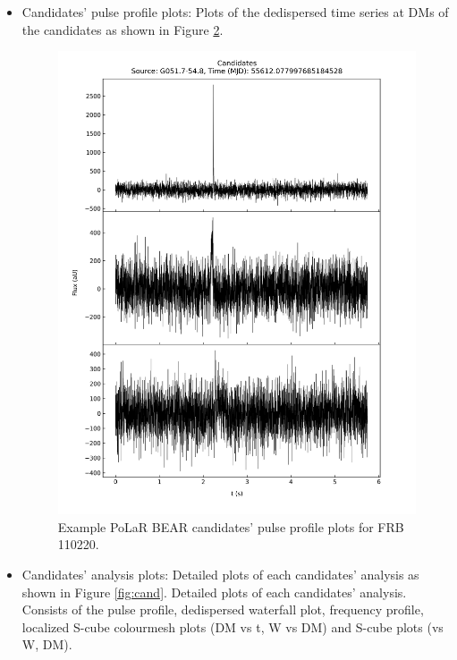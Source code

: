 \begin{itemize}
\begin{figure}
        \label{fig:main}
    \end{figure}
    \item Candidates' pulse profile plots: Plots of the dedispersed time series at DMs of the candidates as shown in Figure \ref{fig:prof}. 
    \begin{figure}
        \centering
        \includegraphics[width=\textwidth]{Images/Example/profile.jpeg}
        \caption[Example PoLaR BEAR candidates' pulse profile plots]{Example PoLaR BEAR candidates' pulse profile plots for FRB 110220.}
        \label{fig:prof}
    \end{figure}
    \item Candidates' analysis plots: Detailed plots of each candidates' analysis as shown in Figure \ref{fig:cand}. Detailed plots of each candidates' analysis. Consists of the pulse profile, dedispersed waterfall plot, frequency profile, localized S-cube colourmesh plots (DM vs t, W vs DM) and S-cube plots (vs W, DM).
    \begin{figure}

\end{figure}
\end{itemize}
